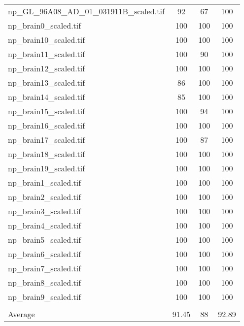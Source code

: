 \begin{tabular}{lccc}
 np\_GL\_96A08\_AD\_01\_031911B\_scaled.tif         & 92    & 67  & 100   \\
 np\_brain0\_scaled.tif                         & 100   & 100 & 100   \\
 np\_brain10\_scaled.tif                        & 100   & 100 & 100   \\
 np\_brain11\_scaled.tif                        & 100   & 90  & 100   \\
 np\_brain12\_scaled.tif                        & 100   & 100 & 100   \\
 np\_brain13\_scaled.tif                        & 86    & 100 & 100   \\
 np\_brain14\_scaled.tif                        & 85    & 100 & 100   \\
 np\_brain15\_scaled.tif                        & 100   & 94  & 100   \\
 np\_brain16\_scaled.tif                        & 100   & 100 & 100   \\
 np\_brain17\_scaled.tif                        & 100   & 87  & 100   \\
 np\_brain18\_scaled.tif                        & 100   & 100 & 100   \\
 np\_brain19\_scaled.tif                        & 100   & 100 & 100   \\
 np\_brain1\_scaled.tif                         & 100   & 100 & 100   \\
 np\_brain2\_scaled.tif                         & 100   & 100 & 100   \\
 np\_brain3\_scaled.tif                         & 100   & 100 & 100   \\
 np\_brain4\_scaled.tif                         & 100   & 100 & 100   \\
 np\_brain5\_scaled.tif                         & 100   & 100 & 100   \\
 np\_brain6\_scaled.tif                         & 100   & 100 & 100   \\
 np\_brain7\_scaled.tif                         & 100   & 100 & 100   \\
 np\_brain8\_scaled.tif                         & 100   & 100 & 100   \\
 np\_brain9\_scaled.tif                         & 100   & 100 & 100   \\
                                              &       &     &       \\
 Average                                      & 91.45 & 88  & 92.89 \\
\hline
\end{tabular}